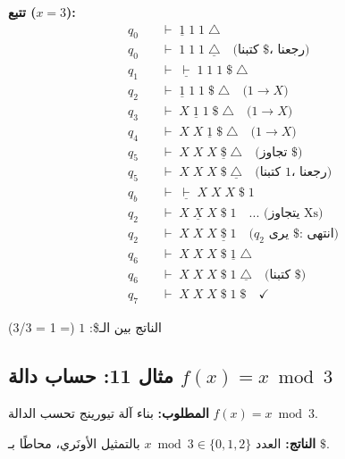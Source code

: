 \documentclass[14pt]{extarticle}
\begin{document}
\textbf{تتبع ($x = 3$):}
{ \small
\begin{align*}
q_0 \quad &\vdash \; \underline{1} \; 1 \; 1 \; \triangle \\
q_0 \quad &\vdash \; 1 \; 1 \; 1 \; \underline{\triangle} \quad \text{(كتبنا $\$$، رجعنا)} \\
q_1 \quad &\vdash \; \underline{\vdash} \; 1 \; 1 \; 1 \; \$ \; \triangle \\
q_2 \quad &\vdash \; \underline{1} \; 1 \; 1 \; \$ \; \triangle \quad \text{($1 \to X$)} \\
q_3 \quad &\vdash \; X \; \underline{1} \; 1 \; \$ \; \triangle \quad \text{($1 \to X$)} \\
q_4 \quad &\vdash \; X \; X \; \underline{1} \; \$ \; \triangle \quad \text{($1 \to X$)} \\
q_5 \quad &\vdash \; X \; X \; X \; \underline{\$} \; \triangle \quad \text{(تجاوز $\$$)} \\
q_5 \quad &\vdash \; X \; X \; X \; \$ \; \underline{\triangle} \quad \text{(كتبنا $1$، رجعنا)} \\
q_b \quad &\vdash \; \underline{\vdash} \; X \; X \; X \; \$ \; 1 \\
q_2 \quad &\vdash \; X \; \underline{X} \; X \; \$ \; 1 \quad \text{... (يتجاوز Xs)} \\
q_2 \quad &\vdash \; X \; X \; X \; \underline{\$} \; 1 \quad \text{($q_2$ يرى $\$$: انتهى)} \\
q_6 \quad &\vdash \; X \; X \; X \; \$ \; \underline{1} \; \triangle \\
q_6 \quad &\vdash \; X \; X \; X \; \$ \; 1 \; \underline{\triangle} \quad \text{(كتبنا $\$$)} \\
q_7 \quad &\vdash \; X \; X \; X \; \$ \; 1 \; \$ \quad \checkmark
\end{align*}
}

الناتج بين الـ\$: $1$ (= 1 = 3/3) \checkmark

\clearpage

\subsection{مثال 11: حساب دالة $f(x) = x \bmod 3$}

\textbf{المطلوب:} بناء آلة تيورينج تحسب الدالة $f(x) = x \bmod 3$.

\textbf{الناتج:} العدد $x \bmod 3 \in \{0, 1, 2\}$ بالتمثيل الأونَري، محاطًا بـ $\$$.
\end{document}
